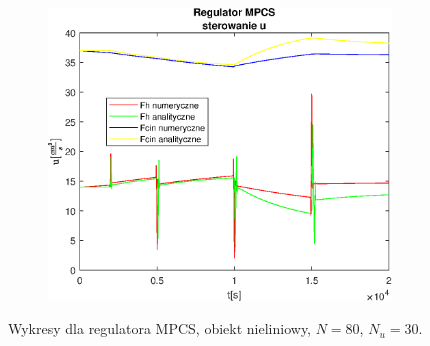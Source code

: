 \begin{figure}[h!]
   \begin{subfigure}[b]{0.4\textwidth}
      \includegraphics[width=1\linewidth]{img/MPCSnumRK/MPCSRKControlN80Nu30l30.eps}
      \caption{}
      \label{fig:fig:MPCSRKN80Nu30l303}
   \end{subfigure}
       
   \caption{Wykresy dla regulatora MPCS, obiekt nieliniowy, $N = 80$, $N_u = 30$.}
   \label{fig:MPCSRKN80Nu30l30}
\end{figure}
           

